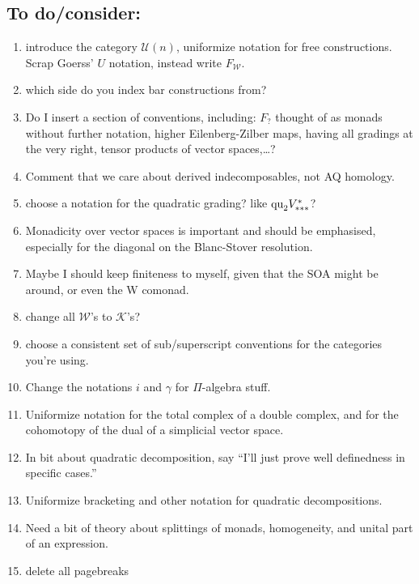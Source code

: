 \documentclass[11pt]{amsart}
\theoremstyle{plain}
\theoremstyle{definition}
\newcommand{\squishlist}{
  \setlength{\itemsep}{.5pt}
  \setlength{\parskip}{0pt}
  \setlength{\parsep}{0pt}}
\newcommand{\calW}{\mathcal{W}}
\newcommand{\calU}{\mathcal{U}}
\newcommand{\calK}{\mathcal{K}}
\theoremstyle{plain}
\begin{document}
\begin{todolist}
\section{\textbf{To do/consider:}}
\begin{enumerate}\squishlist
\setlength{\parindent}{.25in}
\item introduce the category $\calU(n)$, uniformize notation for free constructions. Scrap Goerss' $U$ notation, instead write $F_{\calW}$.
\item which side do you index bar constructions from?
\item Do I insert a section of conventions, including: %
$F_?$ thought of as monads without further notation, %
higher Eilenberg-Zilber maps, %
having all gradings at the very right, tensor products of vector spaces,\ldots?
\item Comment that we care about derived indecomposables, not AQ homology.
\item choose a notation for the quadratic grading? like $\textup{qu}_2V^*_{***}$?
\item Monadicity over vector spaces is important and should be emphasised, especially for the diagonal on the Blanc-Stover resolution.
\item Maybe I should keep finiteness to myself, given that the SOA might be around, or even the W comonad.
\item change all $\calW$'s to $\calK$'s?
\item choose a consistent set of sub/superscript conventions for the categories you're using.
\item Change the notations $i$ and $\gamma$ for $\Pi$-algebra stuff.
\item Uniformize notation for the total complex of a double complex, and for the cohomotopy of the dual of a simplicial vector space.
\item In bit about quadratic decomposition, say ``I'll just prove well definedness in specific cases.''
\item Uniformize bracketing and other notation for quadratic decompositions.
\item Need a bit of theory about splittings of monads, homogeneity, and unital part of an expression.
\item delete all pagebreaks

\end{enumerate}
\end{todolist}
\end{document}
